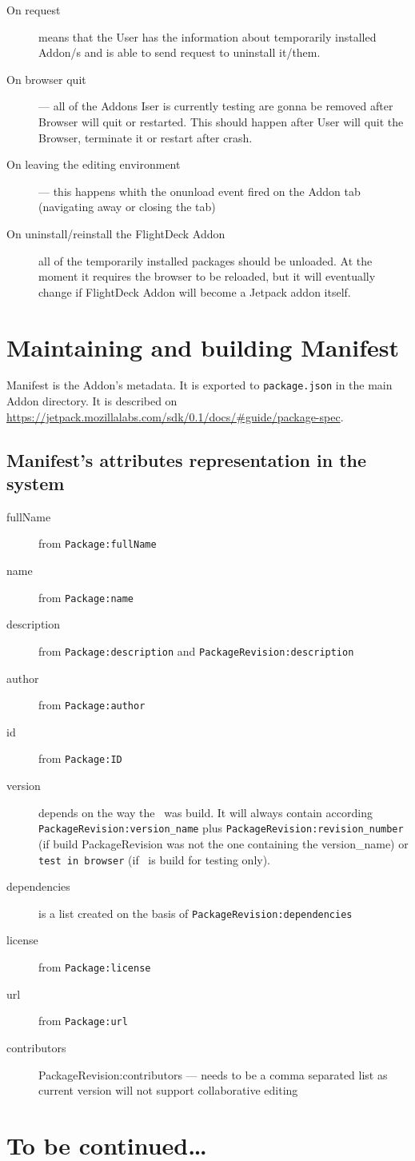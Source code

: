 \documentclass[10pt]{article}
\begin{document}
			\begin{description}
				\item[On request] means that the User has the information about temporarily installed Addon/s 
					and is able to send request to uninstall it/them.
				\item[On browser quit] --- all of the Addons Iser is currently testing are gonna be removed 
					after Browser will quit or restarted. This should happen after User will quit the Browser,
					terminate it or restart after crash.
				\item[On leaving the editing environment] --- this happens whith the onunload event fired 
					on the Addon tab (navigating away or closing the tab)
				\item[On uninstall/reinstall the FlightDeck Addon] all of the temporarily installed 
					packages should be unloaded. At the moment it requires the browser to be reloaded, but
					it will eventually change if FlightDeck Addon will become a Jetpack addon itself.
			\end{description}
	
\section{Maintaining and building Manifest}

	Manifest is the Addon's metadata. It is exported to {\tt package.json} in the main Addon directory. It is 
	described on \url{https://jetpack.mozillalabs.com/sdk/0.1/docs/\#guide/package-spec}.
	
	\subsection{Manifest's attributes representation in the system}
	
	\begin{description}
		\item[fullName] from {\tt Package:fullName}
		\item[name] from {\tt Package:name}
		\item[description] from {\tt Package:description} and {\tt PackageRevision:description}
		\item[author] from {\tt Package:author}
		\item[id] from {\tt Package:ID}
		\item[version] depends on the way the \xpi\ was build. It will always contain according 
			{\tt PackageRevision:version\_name} plus {\tt PackageRevision:revision\_number} 
			(if build PackageRevision was not the one containing the version\_name) or  
			{\tt test in browser} (if \xpi\ is build for testing only).
		\item[dependencies] is a list created on the basis of {\tt PackageRevision:dependencies}
		\item[license] from {\tt Package:license}
		\item[url] from {\tt Package:url}
		\item[contributors] {PackageRevision:contributors} --- needs to be a comma separated list as 
			current version will not support collaborative editing 
	\end{description}
	
	
	
\pagebreak
\section*{To be continued\ldots}
\end{document}
